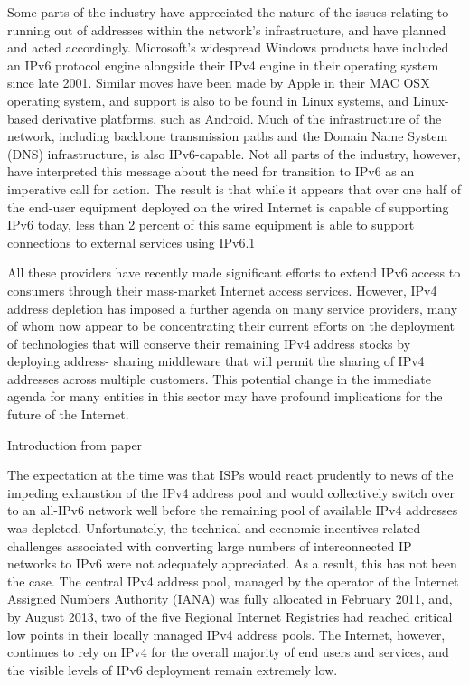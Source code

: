 \documentclass[11pt]{report}
\begin{document}
Some parts of the industry have appreciated the nature of the issues relating to running out of
addresses within the network's infrastructure, and have planned and acted accordingly. Microsoft's
widespread Windows products have included an IPv6 protocol engine alongside their IPv4 engine in their
operating system since late 2001. Similar moves have been made by Apple in their MAC OSX operating
system, and support is also to be found in Linux systems, and Linux-based derivative platforms, such as
Android. Much of the infrastructure of the network, including backbone transmission paths and the
Domain Name System (DNS) infrastructure, is also IPv6-capable. Not all parts of the industry, however,
have interpreted this message about the need for transition to IPv6 as an imperative call for action. The
result is that while it appears that over one half of the end-user equipment deployed on the wired Internet is
capable of supporting IPv6 today, less than 2 percent of this same equipment is able to support connections to
external services using IPv6.1


All these providers have recently made significant efforts to extend IPv6 access to consumers through their
mass-market Internet access services. However, IPv4 address depletion has imposed a further agenda on
many service providers, many of whom now appear to be concentrating their current efforts on the
deployment of technologies that will conserve their remaining IPv4 address stocks by deploying address-
sharing middleware that will permit the sharing of IPv4 addresses across multiple customers. This potential
change in the immediate agenda for many entities in this sector may have profound implications for the
future of the Internet.

Introduction from paper

The expectation at the time was that ISPs would react prudently to news of the impeding
exhaustion of the IPv4 address pool and would collectively switch over to an all-IPv6 network well before
the remaining pool of available IPv4 addresses was depleted. Unfortunately, the technical and economic
incentives-related challenges associated with converting large numbers of interconnected IP networks to
IPv6 were not adequately appreciated. As a result, this has not been the case. The central IPv4 address
pool, managed by the operator of the Internet Assigned Numbers Authority (IANA) was fully allocated in
February 2011, and, by August 2013, two of the five Regional Internet Registries had reached critical low
points in their locally managed IPv4 address pools. The Internet, however, continues to rely on IPv4 for the overall majority of end users and services, and the visible levels of IPv6 deployment remain extremely
low.
\end{document}
